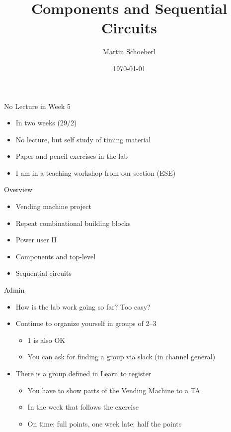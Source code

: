 

\newif\ifbook



\title{Components and Sequential Circuits}
\author{Martin Schoeberl}
\date{\today}



\begin{frame}
\titlepage
\end{frame}

\begin{frame}[fragile]{No Lecture in Week 5}
\begin{itemize}
\item In two weeks (29/2)
\item No lecture, but self study of timing material
\item Paper and pencil exercises in the lab
\item I am in a teaching workshop from our section (ESE)
\end{itemize}
\end{frame}

\begin{frame}[fragile]{Overview}
\begin{itemize}
\item Vending machine project
\item Repeat combinational building blocks
\item Power user II
\item Components and top-level
\item Sequential circuits
\end{itemize}
\end{frame}


\begin{frame}[fragile]{Admin}
\begin{itemize}
\item How is the lab work going so far? Too easy?
\item Continue to organize yourself in groups of 2--3
\begin{itemize}
\item 1 is also OK
\item You can ask for finding a group via slack (in channel general)
\end{itemize}
\item There is a group defined in Learn to register
\begin{itemize}
\item You have to show parts of the Vending Machine to a TA
\item In the week that follows the exercise
\item On time: full points, one week late: half the points
\end{itemize}
\end{itemize}
\end{frame}


